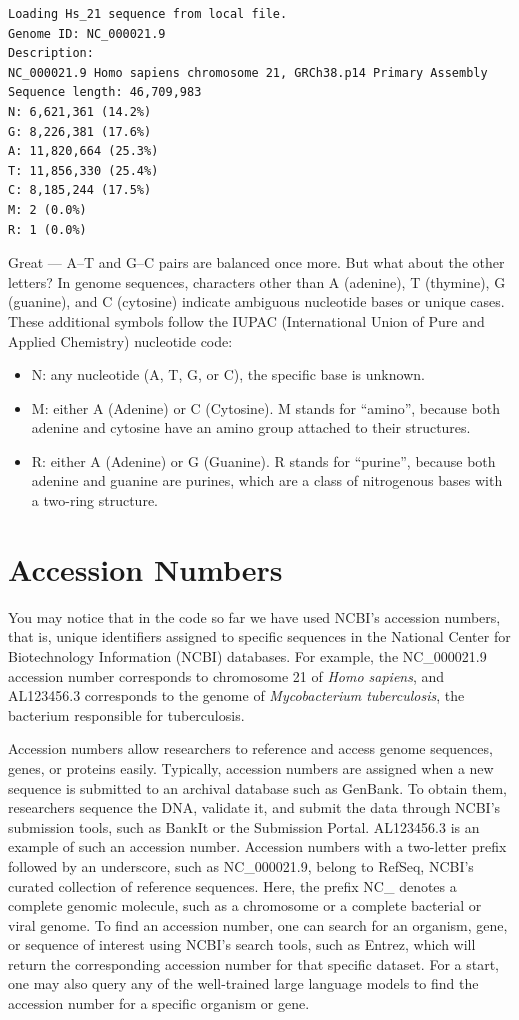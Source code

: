 \vspace*{3mm}
\begin{lstlisting}
Loading Hs_21 sequence from local file.
Genome ID: NC_000021.9
Description: 
NC_000021.9 Homo sapiens chromosome 21, GRCh38.p14 Primary Assembly
Sequence length: 46,709,983
N: 6,621,361 (14.2%)
G: 8,226,381 (17.6%)
A: 11,820,664 (25.3%)
T: 11,856,330 (25.4%)
C: 8,185,244 (17.5%)
M: 2 (0.0%)
R: 1 (0.0%)
\end{lstlisting}

Great — A–T and G–C pairs are balanced once more. But what about the other letters? In genome sequences, characters other than A (adenine), T (thymine), G (guanine), and C (cytosine) indicate ambiguous nucleotide bases or unique cases. These additional symbols follow the IUPAC (International Union of Pure and Applied Chemistry) nucleotide code:

\begin{itemize}
\item N: any nucleotide (A, T, G, or C), the specific base is unknown.
\item M: either A (Adenine) or C (Cytosine). M stands for ``amino'', because both adenine and cytosine have an amino group attached to their structures.
\item R: either A (Adenine) or G (Guanine). R stands for ``purine'', because both adenine and guanine are purines, which are a class of nitrogenous bases with a two-ring structure.
\end{itemize}

\section*{Accession Numbers}

You may notice that in the code so far we have used NCBI's accession numbers, that is, unique identifiers assigned to specific sequences in the National Center for Biotechnology Information (NCBI) databases. For example, the NC\_000021.9 accession number corresponds to chromosome 21 of {\em Homo sapiens}, and AL123456.3 corresponds to the genome of {\em Mycobacterium tuberculosis}, the bacterium responsible for tuberculosis.

Accession numbers allow researchers to reference and access genome sequences, genes, or proteins easily. Typically, accession numbers are assigned when a new sequence is submitted to an archival database such as GenBank. To obtain them, researchers sequence the DNA, validate it, and submit the data through NCBI's submission tools, such as BankIt or the Submission Portal. AL123456.3 is an example of such an accession number. Accession numbers with a two-letter prefix followed by an underscore, such as NC\_000021.9, belong to RefSeq, NCBI's curated collection of reference sequences. Here, the prefix NC\_ denotes a complete genomic molecule, such as a chromosome or a complete bacterial or viral genome. To find an accession number, one can search for an organism, gene, or sequence of interest using NCBI’s search tools, such as Entrez, which will return the corresponding accession number for that specific dataset. For a start, one may also query any of the well-trained large language models to find the accession number for a specific organism or gene.


